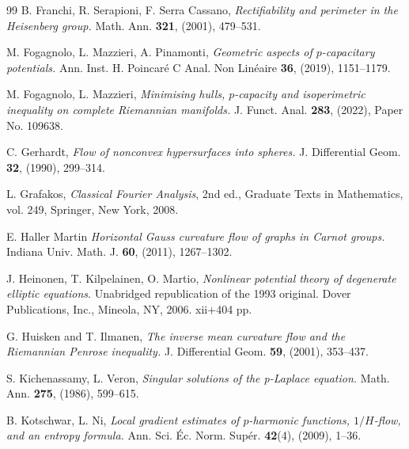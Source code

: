 \documentclass[10pt]{amsart}
\numberwithin{equation}{section}
\theoremstyle{definition}
\begin{document}
\begin{thebibliography}{99}
{\sc B. Franchi, R. Serapioni, F. Serra Cassano},
{\em Rectifiability and perimeter in the Heisenberg group.} 
Math. Ann. {\bf 321}, (2001), 479--531.

{\sc M. Fogagnolo, L. Mazzieri, A. Pinamonti},
{\em Geometric aspects of $p$-capacitary potentials.}  
Ann. Inst. H. Poincar\'e C Anal. Non Lin\'eaire {\bf 36}, (2019), 1151--1179.

{\sc M. Fogagnolo, L. Mazzieri},
{\em Minimising hulls, $p$-capacity and isoperimetric inequality on complete Riemannian manifolds.}
 J. Funct. Anal. {\bf 283}, (2022), Paper No. 109638. 

%

{\sc C. Gerhardt}, 
{\em Flow of nonconvex hypersurfaces into spheres.} 
J. Differential Geom. {\bf 32}, (1990), 299--314.

{\sc L. Grafakos},
{\em Classical Fourier Analysis}, 2nd ed., Graduate Texts in Mathematics, vol. 249, Springer, New York, 2008.

{\sc E. Haller Martin}
{\em Horizontal Gauss curvature flow of graphs in Carnot groups.}
Indiana Univ. Math. J. {\bf 60}, (2011), 1267--1302. 

{\sc J. Heinonen, T. Kilpelainen, O. Martio},
{\em Nonlinear potential theory of degenerate elliptic equations}. 
Unabridged republication of the 1993 original. Dover Publications, Inc., Mineola, NY, 2006. xii+404 pp.

{\sc G. Huisken and T. Ilmanen}, 
{\em The inverse mean curvature flow and the Riemannian Penrose inequality.} 
J. Differential Geom. {\bf 59}, (2001), 353--437.

{\sc S. Kichenassamy, L. Veron}, 
{\em Singular solutions of the p-Laplace equation.} 
Math. Ann. {\bf 275}, (1986), 599--615.


{\sc B. Kotschwar, L. Ni}, 
{\em Local gradient estimates of $p$-harmonic functions, $1/H$-flow, and an entropy formula.} 
Ann. Sci. \'{E}c. Norm. Sup\'{e}r. {\bf 42}(4), (2009), 1--36.


\end{thebibliography}
\end{document}
